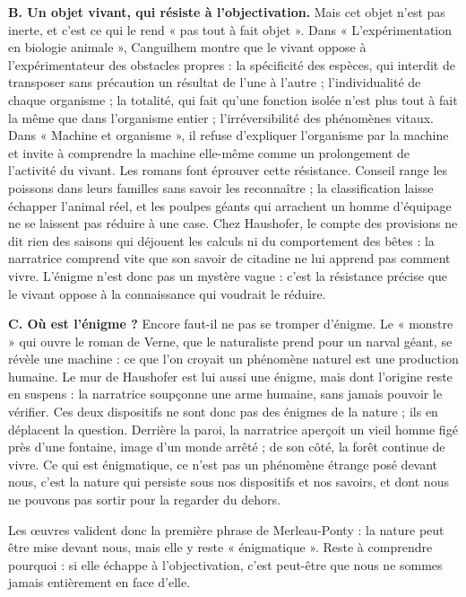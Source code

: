 \documentclass[11pt,a4paper]{article}
\begin{document}
\textbf{B. Un objet vivant, qui résiste à l'objectivation.} Mais cet objet n'est pas inerte, et c'est ce qui le rend « pas tout à fait objet ». Dans « L'expérimentation en biologie animale », Canguilhem montre que le vivant oppose à l'expérimentateur des obstacles propres : la spécificité des espèces, qui interdit de transposer sans précaution un résultat de l'une à l'autre ; l'individualité de chaque organisme ; la totalité, qui fait qu'une fonction isolée n'est plus tout à fait la même que dans l'organisme entier ; l'irréversibilité des phénomènes vitaux. Dans « Machine et organisme », il refuse d'expliquer l'organisme par la machine et invite à comprendre la machine elle-même comme un prolongement de l'activité du vivant. Les romans font éprouver cette résistance. Conseil range les poissons dans leurs familles sans savoir les reconnaître ; la classification laisse échapper l'animal réel, et les poulpes géants qui arrachent un homme d'équipage ne se laissent pas réduire à une case. Chez Haushofer, le compte des provisions ne dit rien des saisons qui déjouent les calculs ni du comportement des bêtes : la narratrice comprend vite que son savoir de citadine ne lui apprend pas comment vivre. L'énigme n'est donc pas un mystère vague : c'est la résistance précise que le vivant oppose à la connaissance qui voudrait le réduire.

\textbf{C. Où est l'énigme ?} Encore faut-il ne pas se tromper d'énigme. Le « monstre » qui ouvre le roman de Verne, que le naturaliste prend pour un narval géant, se révèle une machine : ce que l'on croyait un phénomène naturel est une production humaine. Le mur de Haushofer est lui aussi une énigme, mais dont l'origine reste en suspens : la narratrice soupçonne une arme humaine, sans jamais pouvoir le vérifier. Ces deux dispositifs ne sont donc pas des énigmes de la nature ; ils en déplacent la question. Derrière la paroi, la narratrice aperçoit un vieil homme figé près d'une fontaine, image d'un monde arrêté ; de son côté, la forêt continue de vivre. Ce qui est énigmatique, ce n'est pas un phénomène étrange posé devant nous, c'est la nature qui persiste sous nos dispositifs et nos savoirs, et dont nous ne pouvons pas sortir pour la regarder du dehors.

Les œuvres valident donc la première phrase de Merleau-Ponty : la nature peut être mise devant nous, mais elle y reste « énigmatique ». Reste à comprendre pourquoi : si elle échappe à l'objectivation, c'est peut-être que nous ne sommes jamais entièrement en face d'elle.
\end{document}
